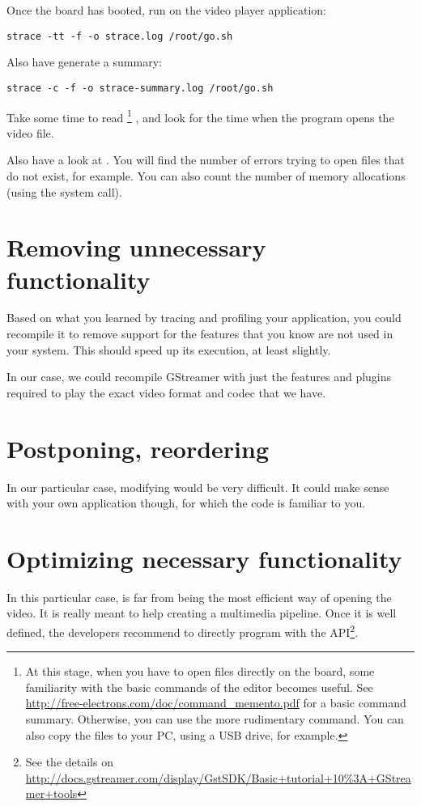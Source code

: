 Once the board has booted, run  on the video player
application:

\begin{verbatim}
strace -tt -f -o strace.log /root/go.sh
\end{verbatim}

Also have  generate a summary:

\begin{verbatim}
strace -c -f -o strace-summary.log /root/go.sh
\end{verbatim}

Take some time to read \footnote{
At this stage, when you have to open files directly on the
board, some familiarity with the basic commands of the  editor
becomes useful. See
\url{http://free-electrons.com/doc/command_memento.pdf} for a basic
command summary. Otherwise, you can use the more rudimentary 
command. You can also copy the files to your PC, using a USB drive, for
example.}
, and look for the time when the program opens the video file.

Also have a look at . You will find the number
of errors trying to open files that do not exist, for example. You can
also count the number of memory allocations (using the  system call).

\section{Removing unnecessary functionality}

Based on what you learned by tracing and profiling your application, you
could recompile it to remove support for the features that you know are
not used in your system. This should speed up its execution, at least
slightly.

In our case, we could recompile GStreamer with just the features
and plugins required to play the exact video format and codec that we
have.

\section{Postponing, reordering}

In our particular case, modifying  would be very
difficult. It could make sense with your own application though, for
which the code is familiar to you.

\section{Optimizing necessary functionality}

In this particular case,  is far from being the most
efficient way of opening the video. It is really meant to help creating
a multimedia pipeline. Once it is well defined, the 
developers recommend to directly program with the 
API\footnote{See the details on
\url{http://docs.gstreamer.com/display/GstSDK/Basic+tutorial+10\%3A+GStreamer+tools}}.
